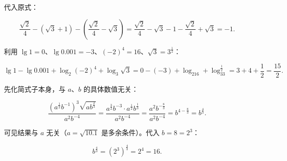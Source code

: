 \begin{answer}
代入原式：

\nopagebreak[4]
\[
\frac{\sqrt2}{4}-(\sqrt3+1)-\left(\frac{\sqrt2}{4}-\sqrt3\right)
=\frac{\sqrt2}{4}-\sqrt3-1-\frac{\sqrt2}{4}+\sqrt3=-1.
\]


利用 $\lg1=0$、$\lg0.001=-3$、$(-2)^4=16$、$\sqrt3=3^{\frac12}$：

\nopagebreak[4]
\[
\lg1-\lg0.001+\log_2(-2)^4+\log_3\sqrt3
=0-(-3)+\log_216+\log_33^{\frac12}
=3+4+\frac12=\frac{15}{2}.
\]


先化简式子本身，与 $a$、$b$ 的具体数值无关：

\nopagebreak[4]
\[
\frac{\left(a^{\frac12}b^{-1}\right)^3\sqrt{ab^{\frac23}}}{a^2b^{-4}}
=\frac{a^{\frac32}b^{-3}\cdot a^{\frac12}b^{\frac13}}{a^2b^{-4}}
=\frac{a^{2}b^{-\frac83}}{a^2b^{-4}}
=b^{4-\frac83}=b^{\frac43}.
\]

可见结果与 $a$ 无关（$a=\sqrt{10.1}$ 是多余条件）。代入 $b=8=2^3$：

\nopagebreak[4]
\[
b^{\frac43}=\left(2^3\right)^{\frac43}=2^4=16.
\]





\end{answer}
